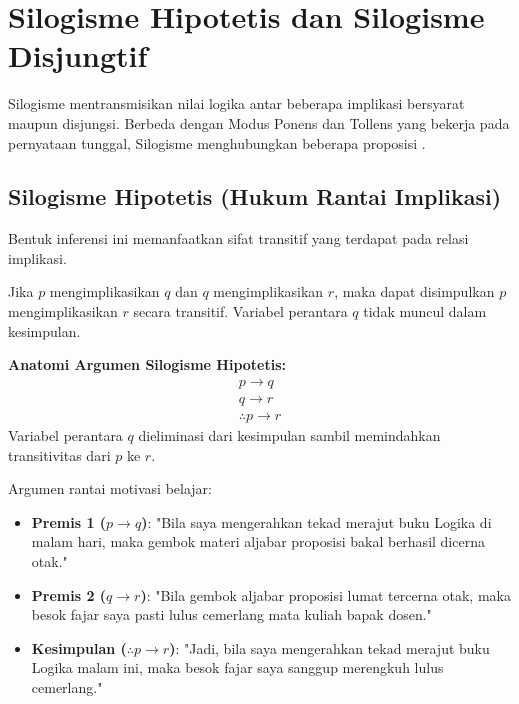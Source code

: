 \section{Silogisme Hipotetis dan Silogisme Disjungtif}

Silogisme mentransmisikan nilai logika antar beberapa implikasi bersyarat maupun disjungsi. Berbeda dengan Modus Ponens dan Tollens yang bekerja pada pernyataan tunggal, Silogisme menghubungkan beberapa proposisi \cite{rosen2019}.

\subsection{Silogisme Hipotetis (Hukum Rantai Implikasi)}

Bentuk inferensi ini memanfaatkan sifat transitif yang terdapat pada relasi implikasi. 

\begin{teorema}
Jika $p$ mengimplikasikan $q$ dan $q$ mengimplikasikan $r$, maka dapat disimpulkan $p$ mengimplikasikan $r$ secara transitif. Variabel perantara $q$ tidak muncul dalam kesimpulan.
\end{teorema}

\textbf{Anatomi Argumen Silogisme Hipotetis:}
\[
\begin{array}{c}
p \rightarrow q \\
q \rightarrow r \\
\hline
\therefore p \rightarrow r
\end{array}
\]
Variabel perantara $q$ dieliminasi dari kesimpulan sambil memindahkan transitivitas dari $p$ ke $r$.

\begin{contoh}
Argumen rantai motivasi belajar:
\begin{itemize}
    \item \textbf{Premis 1 ($p \rightarrow q$)}: "Bila saya mengerahkan tekad merajut buku Logika di malam hari, maka gembok materi aljabar proposisi bakal berhasil dicerna otak."
    \item \textbf{Premis 2 ($q \rightarrow r$)}: "Bila gembok aljabar proposisi lumat tercerna otak, maka besok fajar saya pasti lulus cemerlang mata kuliah bapak dosen."
    \item \textbf{Kesimpulan ($\therefore p \rightarrow r$)}: "Jadi, bila saya mengerahkan tekad merajut buku Logika malam ini, maka besok fajar saya sanggup merengkuh lulus cemerlang."
\end{itemize}
\end{contoh}

